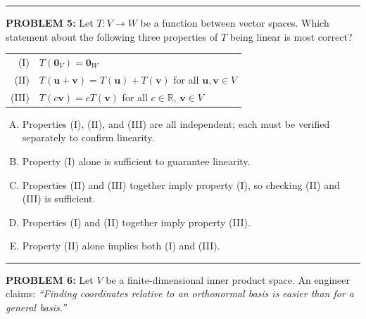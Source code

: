 \documentclass[12pt]{amsart}
\newcommand{\divider}{
  \vspace{-1em} %
  \noindent
  \raisebox{-0.15ex}{\textbullet}%
  \hspace{0.5em}%
  \rule[0.5ex]{0.95\textwidth}{1.0pt}%
  \hspace{0.5em}%
  \raisebox{-0.15ex}{\textbullet}%
  \vspace{0em} %
}
\begin{document}
\divider


{\bf PROBLEM 5:}
% 
Let $T: V \to W$ be a function between vector spaces. Which statement about 
the following three properties of $T$ being linear is most correct?

\begin{center}
\begin{tabular}{rl}
(I) & $T(\mathbf{0}_V) = \mathbf{0}_W$ \\[4pt]
(II) & $T(\mathbf{u} + \mathbf{v}) = T(\mathbf{u}) + T(\mathbf{v})$ for all $\mathbf{u}, \mathbf{v} \in V$ \\[4pt]
(III) & $T(c\mathbf{v}) = cT(\mathbf{v})$ for all $c \in \mathbb{R}$, $\mathbf{v} \in V$
\end{tabular}
\end{center}

\begin{enumerate}[(A)]
\item Properties (I), (II), and (III) are all independent; each must be verified separately to confirm linearity.
\item Property (I) alone is sufficient to guarantee linearity.
\item Properties (II) and (III) together imply property (I), so checking (II) and (III) is sufficient.
\item Properties (I) and (II) together imply property (III).
\item Property (II) alone implies both (I) and (III).
\end{enumerate}


\divider


{\bf PROBLEM 6:}
%
Let $V$ be a finite-dimensional inner product space. An engineer claims: 
{\em ``Finding coordinates relative to an orthonormal basis is easier than for a general basis.''}
\end{document}
